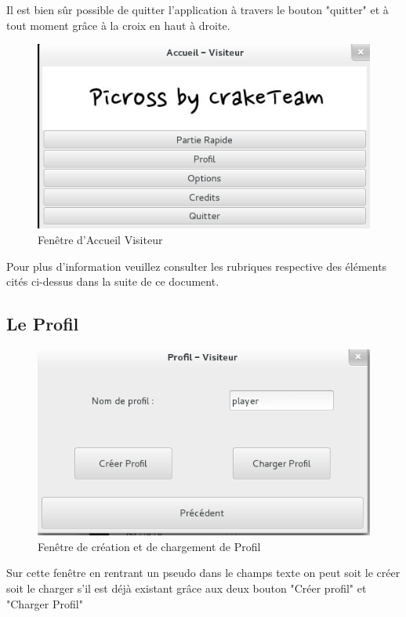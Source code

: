 \documentclass[11pt]{article}
\begin{document}
Il est bien sûr possible de quitter l'application à travers le bouton "quitter" et à tout moment grâce à la croix en haut à droite.

	\begin{figure}[!ht]
		\centering
		\includegraphics{./Screenshot/AccueilVisiteur.png}
		\caption{Fenêtre d'Accueil Visiteur}
	\end{figure}

Pour plus d'information veuillez consulter les rubriques respective des éléments cités ci-dessus dans la suite de ce document.

\newpage

\subsection{Le Profil}

	\begin{figure}[!ht]
		\centering
		\includegraphics{./Screenshot/Profil.png}
		\caption{Fenêtre de création et de chargement de Profil}
	\end{figure}

Sur cette fenêtre en rentrant un pseudo dans le champs texte on peut soit le créer soit le charger s'il est déjà existant grâce aux deux bouton "Créer profil" et "Charger Profil"
\end{document}
